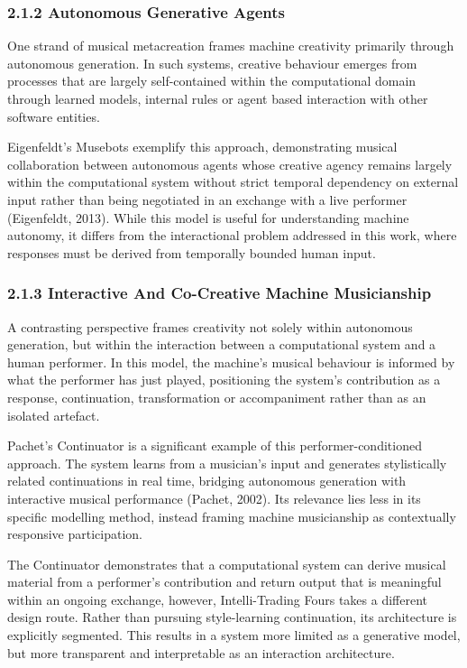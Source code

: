 \subsubsection{2.1.2 Autonomous Generative
Agents}\label{autonomous-generative-agents}

One strand of musical metacreation frames machine creativity primarily
through autonomous generation. In such systems, creative behaviour
emerges from processes that are largely self-contained within the
computational domain through learned models, internal rules or agent
based interaction with other software entities.

Eigenfeldt's Musebots exemplify this approach, demonstrating musical
collaboration between autonomous agents whose creative agency remains
largely within the computational system without strict temporal
dependency on external input rather than being negotiated in an exchange
with a live performer (Eigenfeldt, 2013). While this model is useful for
understanding machine autonomy, it differs from the interactional
problem addressed in this work, where responses must be derived from
temporally bounded human input.

\subsubsection{2.1.3 Interactive And Co-Creative Machine
Musicianship}\label{interactive-and-co-creative-machine-musicianship}

A contrasting perspective frames creativity not solely within autonomous
generation, but within the interaction between a computational system
and a human performer. In this model, the machine's musical behaviour is
informed by what the performer has just played, positioning the system's
contribution as a response, continuation, transformation or
accompaniment rather than as an isolated artefact.

Pachet's Continuator is a significant example of this
performer-conditioned approach. The system learns from a musician's
input and generates stylistically related continuations in real time,
bridging autonomous generation with interactive musical performance
(Pachet, 2002). Its relevance lies less in its specific modelling
method, instead framing machine musicianship as contextually responsive
participation.

The Continuator demonstrates that a computational system can derive
musical material from a performer's contribution and return output that
is meaningful within an ongoing exchange, however, Intelli-Trading Fours
takes a different design route. Rather than pursuing style-learning
continuation, its architecture is explicitly segmented. This results in
a system more limited as a generative model, but more transparent and
interpretable as an interaction architecture.


